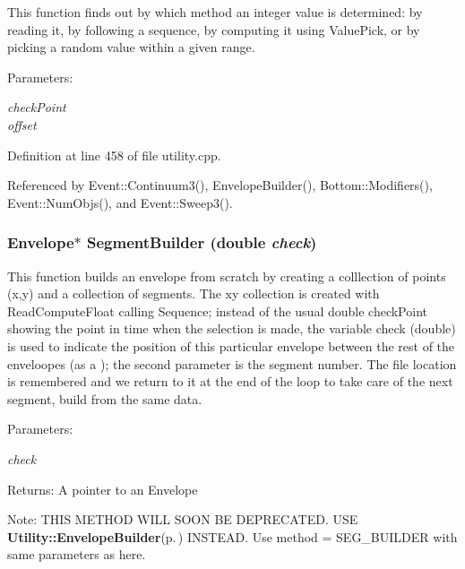 This function finds out by which method an integer value is determined: by reading it, by following a sequence, by computing it using Value\-Pick, or by picking a random value within a given range. \begin{Desc}
\item[Parameters:]
\begin{description}
\item[{\em check\-Point}]\item[{\em offset}]\end{description}
\end{Desc}


Definition at line 458 of file utility.cpp.

Referenced by Event::Continuum3(), Envelope\-Builder(), Bottom::Modifiers(), Event::Num\-Objs(), and Event::Sweep3().
\subsubsection{\setlength{\rightskip}{0pt plus 5cm}Envelope$\ast$ Segment\-Builder (double {\em check})}\label{utility_8h_a24}


This function builds an envelope from scratch by creating a colllection of points (x,y) and a collection of segments. The xy collection is created with Read\-Compute\-Float calling Sequence; instead of the usual double check\-Point showing the point in time when the selection is made, the variable check (double) is used to indicate the position of this particular envelope between the rest of the enveloopes (as a ); the second parameter is the segment number. The file location is remembered and we return to it at the end of the loop to take care of the next segment, build from the same data. \begin{Desc}
\item[Parameters:]
\begin{description}
\item[{\em check}]\end{description}
\end{Desc}
\begin{Desc}
\item[Returns:]A pointer to an Envelope \end{Desc}
\begin{Desc}
\item[Note:]THIS METHOD WILL SOON BE DEPRECATED. USE {\bf Utility::Envelope\-Builder}{\rm (p.\,\pageref{utility_8h_a19})} INSTEAD. Use method = SEG\_\-BUILDER with same parameters as here. \end{Desc}
